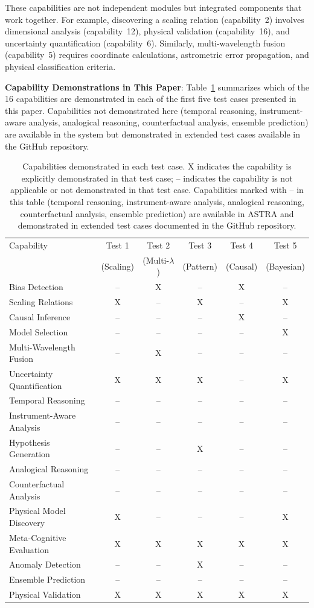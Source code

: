 \documentclass[usenatbib]{rasti}
\begin{document}
These capabilities are not independent modules but integrated components that work together. For example, discovering a scaling relation (capability~2) involves dimensional analysis (capability~12), physical validation (capability~16), and uncertainty quantification (capability~6). Similarly, multi-wavelength fusion (capability~5) requires coordinate calculations, astrometric error propagation, and physical classification criteria.

\textbf{Capability Demonstrations in This Paper}: Table~\ref{tab:capabilities} summarizes which of the 16 capabilities are demonstrated in each of the first five test cases presented in this paper. Capabilities not demonstrated here (temporal reasoning, instrument-aware analysis, analogical reasoning, counterfactual analysis, ensemble prediction) are available in the system but demonstrated in extended test cases available in the GitHub repository.

\begin{table}
\centering
\begin{tabular}{lccccc}
\hline
Capability & Test 1 & Test 2 & Test 3 & Test 4 & Test 5 \\
& (Scaling) & (Multi-$\lambda$) & (Pattern) & (Causal) & (Bayesian) \\
\hline
Bias Detection & -- & X & -- & X & -- \\
Scaling Relations & X & -- & X & -- & X \\
Causal Inference & -- & -- & -- & X & -- \\
Model Selection & -- & -- & -- & -- & X \\
Multi-Wavelength Fusion & -- & X & -- & -- & -- \\
Uncertainty Quantification & X & X & X & -- & X \\
Temporal Reasoning & -- & -- & -- & -- & -- \\
Instrument-Aware Analysis & -- & -- & -- & -- & -- \\
Hypothesis Generation & -- & -- & X & -- & -- \\
Analogical Reasoning & -- & -- & -- & -- & -- \\
Counterfactual Analysis & -- & -- & -- & -- & -- \\
Physical Model Discovery & X & -- & -- & -- & X \\
Meta-Cognitive Evaluation & X & X & X & X & X \\
Anomaly Detection & -- & -- & X & -- & -- \\
Ensemble Prediction & -- & -- & -- & -- & -- \\
Physical Validation & X & X & X & X & X \\
\hline
\end{tabular}
\caption{Capabilities demonstrated in each test case. X indicates the capability is explicitly demonstrated in that test case; -- indicates the capability is not applicable or not demonstrated in that test case. Capabilities marked with -- in this table (temporal reasoning, instrument-aware analysis, analogical reasoning, counterfactual analysis, ensemble prediction) are available in ASTRA and demonstrated in extended test cases documented in the GitHub repository.}
\label{tab:capabilities}
\end{table}
\end{document}
